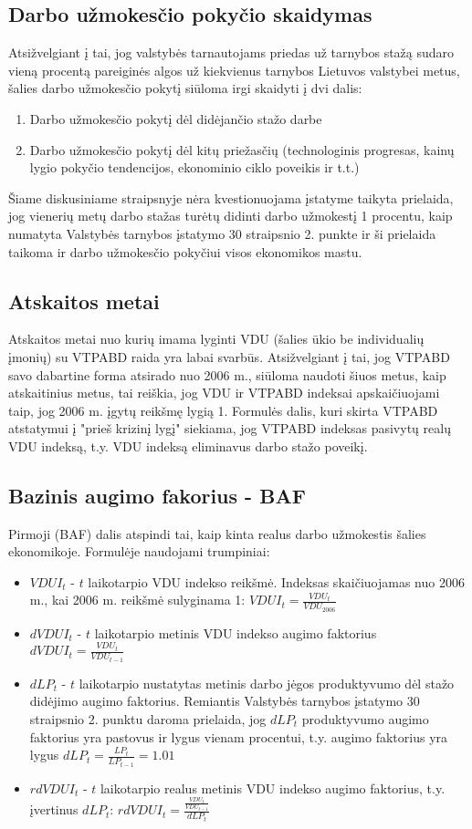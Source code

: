 \documentclass[titlepage, 11pt]{article}
\begin{document}
\subsection{Darbo užmokesčio pokyčio skaidymas}
Atsižvelgiant į tai, jog valstybės tarnautojams priedas už tarnybos stažą sudaro vieną procentą pareiginės algos už kiekvienus tarnybos Lietuvos valstybei metus, šalies darbo užmokesčio pokytį siūloma irgi skaidyti į dvi dalis:
\begin{enumerate}
\item Darbo užmokesčio pokytį dėl didėjančio stažo darbe
\item Darbo užmokesčio pokytį dėl kitų priežasčių (technologinis progresas, kainų lygio pokyčio tendencijos, ekonominio ciklo poveikis ir t.t.)
\end{enumerate}
Šiame diskusiniame straipsnyje nėra kvestionuojama įstatyme taikyta prielaida, jog vienerių metų darbo stažas turėtų didinti darbo užmokestį 1 procentu, kaip numatyta Valstybės tarnybos įstatymo 30 straipsnio 2. punkte ir ši prielaida taikoma ir darbo užmokesčio pokyčiui visos ekonomikos mastu.

\subsection{Atskaitos metai}
Atskaitos metai nuo kurių imama lyginti VDU (šalies ūkio be individualių įmonių) su  VTPABD raida yra labai svarbūs. Atsižvelgiant į tai, jog VTPABD savo dabartine forma atsirado nuo 2006 m., siūloma naudoti šiuos metus, kaip atskaitinius metus, tai reiškia, jog VDU ir VTPABD indeksai apskaičiuojami taip, jog 2006 m. įgytų reikšmę lygią 1. 
Formulės dalis, kuri skirta VTPABD atstatymui į "prieš krizinį lygį" siekiama, jog VTPABD indeksas pasivytų realų VDU indeksą, t.y. VDU indeksą eliminavus darbo stažo poveikį.

\subsection{Bazinis augimo fakorius - BAF}
Pirmoji (BAF) dalis atspindi tai, kaip kinta realus darbo užmokestis šalies ekonomikoje. Formulėje naudojami trumpiniai:

\begin{itemize}
\item $VDUI_{t}$ - $t$ laikotarpio VDU indekso reikšmė. Indeksas skaičiuojamas nuo 2006 m., kai 2006 m. reikšmė sulyginama 1: $VDUI_{t}=\frac{VDU_{t}}{VDU_{2006}}$
\item $dVDUI_t$ - $t$ laikotarpio metinis VDU indekso augimo faktorius $dVDUI_{t}=\frac{VDU_{t}}{VDU_{t-1}}$
\item $dLP_t$ - $t$ laikotarpio nustatytas metinis darbo jėgos produktyvumo dėl stažo didėjimo augimo faktorius. Remiantis Valstybės tarnybos įstatymo 30 straipsnio 2. punktu daroma prielaida, jog $dLP_t$ produktyvumo augimo faktorius yra pastovus ir lygus vienam procentui, t.y. augimo faktorius yra lygus $dLP_t=\frac{LP_t}{LP_{t-1}}=1.01$
\item $rdVDUI_t$ - $t$ laikotarpio realus metinis VDU indekso augimo faktorius, t.y.  įvertinus $dLP_t$: $rdVDUI_t=\frac{\frac{VDU_{t}}{VDU_{t-1}}}{dLP_t}$
\end{itemize}
\end{document}
